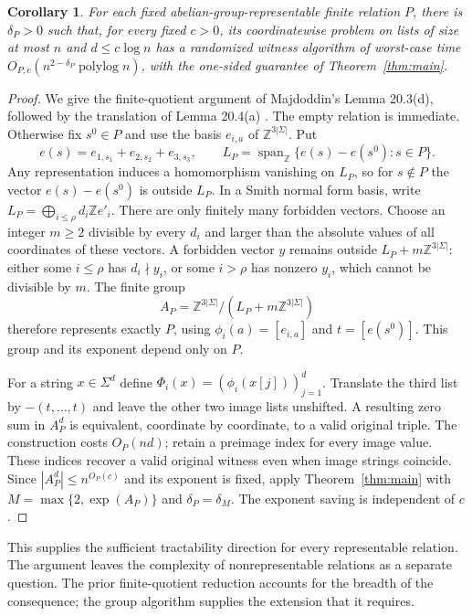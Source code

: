 \documentclass[acmsmall,11pt,nonacm,natbib=false]{acmart}
\newtheorem{corollary}[theorem]{Corollary}
\newcommand{\Z}{\mathbb Z}
\newcommand{\polylog}{\operatorname{polylog}}
\begin{document}
\begin{corollary}\label{cor:relation}
For each fixed abelian-group-representable finite relation $P$, there is
$\delta_P>0$ such that, for every fixed $c>0$, its coordinatewise problem
on lists of size at most $n$ and $d\le c\log n$ has a randomized witness
algorithm of worst-case time $O_{P,c}(n^{2-\delta_P}\polylog n)$,
with the one-sided guarantee of Theorem~\ref{thm:main}.
\end{corollary}
\begin{proof}
We give the finite-quotient argument of Majdoddin's Lemma 20.3(d), followed
by the translation of Lemma 20.4(a) \cite{Maj26}. The empty relation is
immediate. Otherwise fix $s^0\in P$ and use the basis $e_{i,a}$ of
$\Z^{3|\Sigma|}$. Put
\[
 e(s)=e_{1,s_1}+e_{2,s_2}+e_{3,s_3},\qquad
 L_P=\operatorname{span}_{\Z}\{e(s)-e(s^0):s\in P\}.
\]
Any representation induces a homomorphism vanishing on $L_P$, so for
$s\notin P$ the vector $e(s)-e(s^0)$ is outside $L_P$. In a Smith normal
form basis, write $L_P=\bigoplus_{i\le\rho}d_i\Z e'_i$. There are only
finitely many forbidden vectors. Choose an integer $m\ge2$ divisible by
every $d_i$ and larger than the absolute values of all coordinates of
these vectors. A forbidden vector $y$ remains outside
$L_P+m\Z^{3|\Sigma|}$: either some $i\le\rho$ has $d_i\nmid y_i$, or
some $i>\rho$ has nonzero $y_i$, which cannot be divisible by $m$.
The finite group
\[
 A_P=\Z^{3|\Sigma|}/(L_P+m\Z^{3|\Sigma|})
\]
therefore represents exactly $P$, using $\phi_i(a)=[e_{i,a}]$ and
$t=[e(s^0)]$. This group and its exponent depend only on $P$.

For a string $x\in\Sigma^d$ define
$\Phi_i(x)=(\phi_i(x[j]))_{j=1}^d$. Translate the third list by
$-(t,\ldots,t)$ and leave the other two image lists unshifted. A resulting
zero sum in $A_P^d$ is equivalent, coordinate by coordinate, to a valid
original triple. The construction costs $O_P(nd)$; retain a preimage
index for every image value. These indices recover a valid original
witness even when image strings coincide. Since
$|A_P^d|\le n^{O_P(c)}$ and its exponent is fixed, apply
Theorem~\ref{thm:main} with $M=\max\{2,\exp(A_P)\}$ and
$\delta_P=\delta_M$. The exponent saving is independent of $c$.
\end{proof}

This supplies the sufficient tractability direction for every representable
relation. The argument leaves the complexity of nonrepresentable relations
as a separate question. The prior finite-quotient reduction accounts for
the breadth of the consequence; the group algorithm supplies the extension
that it requires.
\end{document}

